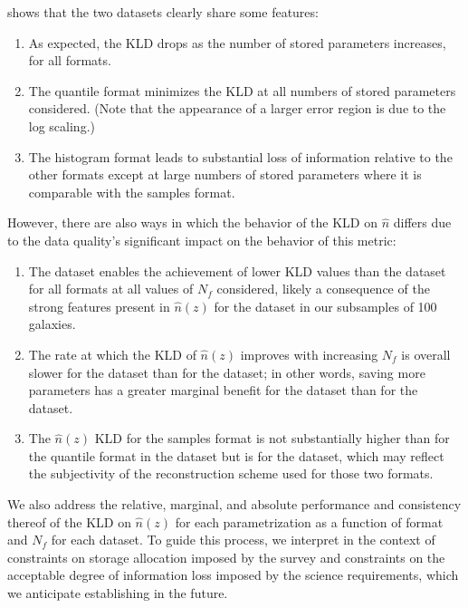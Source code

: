  shows that the two datasets clearly share some features:
\begin{enumerate}
	\item As expected, the KLD drops as the number of stored parameters increases, 
	for all formats.
	\item The quantile format minimizes the KLD at all numbers of stored parameters 
	considered.  (Note that the appearance of a larger error region is due to the 
	log scaling.)
	\item The histogram format leads to substantial loss of information relative to 
	the other formats except at large numbers of stored parameters where it is 
	comparable with the samples format.
\end{enumerate}
However, there are also ways in which the behavior of the KLD on $\hat{n}$ 
differs due to the data quality's significant impact on the behavior of this 
metric:
\begin{enumerate}
	\item The \ssdata dataset enables the achievement of lower KLD values than the 
	\mgdata dataset for all formats at all values of $N_{f}$ considered, likely a 
	consequence of the strong features present in $\hat{n}(z)$ for the \mgdata 
	dataset in our subsamples of 100 galaxies.
	\item The rate at which the KLD of $\hat{n}(z)$ improves with increasing $N_{f} 
	$ is overall slower for the \mgdata dataset than for the \ssdata dataset; in 
	other words, saving more parameters has a greater marginal benefit for the 
	\ssdata dataset than for the \mgdata dataset.
	\item The $\hat{n}(z)$ KLD for the samples format is not substantially higher 
	than for the quantile format in the \ssdata dataset but is for the \mgdata 
	dataset, which may reflect the subjectivity of the reconstruction scheme used 
	for those two formats.
\end{enumerate}

We also address the relative, marginal, and absolute performance and 
consistency thereof of the KLD on $\hat{n}(z)$ for each parametrization as a 
function of format and $N_{f}$ for each dataset.
To guide this process, we interpret  in the context of 
constraints on storage allocation imposed by the survey and constraints on the 
acceptable degree of information loss imposed by the science requirements, 
which we anticipate establishing in the future.

